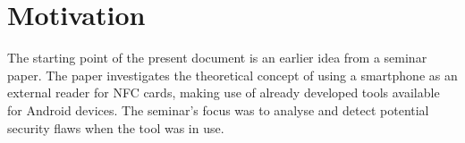 \section{Motivation} \label{motivation}
The starting point of the present document is an earlier idea from a seminar paper. The paper investigates the theoretical concept of using a smartphone as an external reader for NFC cards, making use of already developed tools available for Android devices. The seminar's focus was to analyse and detect potential security flaws when the tool was in use.

